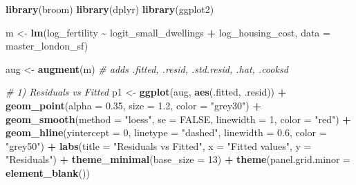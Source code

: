 \documentclass[
]{article}
\newenvironment{Shaded}{\begin{snugshade}}{\end{snugshade}}
\newcommand{\AttributeTok}[1]{\textcolor[rgb]{0.13,0.29,0.53}{#1}}
\newcommand{\CommentTok}[1]{\textcolor[rgb]{0.56,0.35,0.01}{\textit{#1}}}
\newcommand{\ConstantTok}[1]{\textcolor[rgb]{0.56,0.35,0.01}{#1}}
\newcommand{\DecValTok}[1]{\textcolor[rgb]{0.00,0.00,0.81}{#1}}
\newcommand{\FloatTok}[1]{\textcolor[rgb]{0.00,0.00,0.81}{#1}}
\newcommand{\FunctionTok}[1]{\textcolor[rgb]{0.13,0.29,0.53}{\textbf{#1}}}
\newcommand{\NormalTok}[1]{#1}
\newcommand{\OtherTok}[1]{\textcolor[rgb]{0.56,0.35,0.01}{#1}}
\newcommand{\SpecialCharTok}[1]{\textcolor[rgb]{0.81,0.36,0.00}{\textbf{#1}}}
\newcommand{\StringTok}[1]{\textcolor[rgb]{0.31,0.60,0.02}{#1}}
\begin{document}
\begin{Shaded}
\begin{Highlighting}[]
\FunctionTok{library}\NormalTok{(broom)}
\FunctionTok{library}\NormalTok{(dplyr)}
\FunctionTok{library}\NormalTok{(ggplot2)}

\NormalTok{m }\OtherTok{\textless{}{-}} \FunctionTok{lm}\NormalTok{(log\_fertility }\SpecialCharTok{\textasciitilde{}}\NormalTok{ logit\_small\_dwellings }\SpecialCharTok{+}\NormalTok{ log\_housing\_cost, }\AttributeTok{data =}\NormalTok{ master\_london\_sf)}

\NormalTok{aug }\OtherTok{\textless{}{-}} \FunctionTok{augment}\NormalTok{(m)  }\CommentTok{\# adds .fitted, .resid, .std.resid, .hat, .cooksd}

\CommentTok{\# 1) Residuals vs Fitted}
\NormalTok{p1 }\OtherTok{\textless{}{-}} \FunctionTok{ggplot}\NormalTok{(aug, }\FunctionTok{aes}\NormalTok{(.fitted, .resid)) }\SpecialCharTok{+}
  \FunctionTok{geom\_point}\NormalTok{(}\AttributeTok{alpha =} \FloatTok{0.35}\NormalTok{, }\AttributeTok{size =} \FloatTok{1.2}\NormalTok{, }\AttributeTok{color =} \StringTok{"grey30"}\NormalTok{) }\SpecialCharTok{+}
  \FunctionTok{geom\_smooth}\NormalTok{(}\AttributeTok{method =} \StringTok{"loess"}\NormalTok{, }\AttributeTok{se =} \ConstantTok{FALSE}\NormalTok{, }\AttributeTok{linewidth =} \DecValTok{1}\NormalTok{, }\AttributeTok{color =} \StringTok{"red"}\NormalTok{) }\SpecialCharTok{+}
  \FunctionTok{geom\_hline}\NormalTok{(}\AttributeTok{yintercept =} \DecValTok{0}\NormalTok{, }\AttributeTok{linetype =} \StringTok{"dashed"}\NormalTok{, }\AttributeTok{linewidth =} \FloatTok{0.6}\NormalTok{, }\AttributeTok{color =} \StringTok{"grey50"}\NormalTok{) }\SpecialCharTok{+}
  \FunctionTok{labs}\NormalTok{(}\AttributeTok{title =} \StringTok{"Residuals vs Fitted"}\NormalTok{, }\AttributeTok{x =} \StringTok{"Fitted values"}\NormalTok{, }\AttributeTok{y =} \StringTok{"Residuals"}\NormalTok{) }\SpecialCharTok{+}
  \FunctionTok{theme\_minimal}\NormalTok{(}\AttributeTok{base\_size =} \DecValTok{13}\NormalTok{) }\SpecialCharTok{+}
  \FunctionTok{theme}\NormalTok{(}\AttributeTok{panel.grid.minor =} \FunctionTok{element\_blank}\NormalTok{())}


\end{Highlighting}
\end{Shaded}
\end{document}
